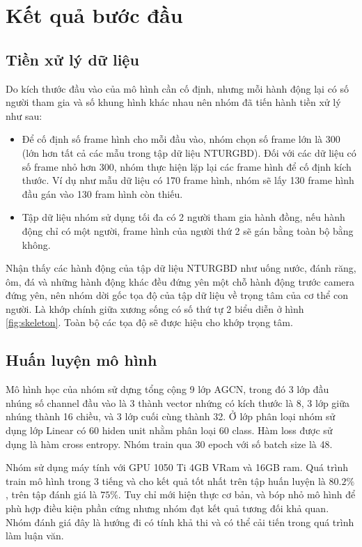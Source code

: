 \section{Kết quả bước đầu}
\label{section:result}

\subsection{Tiền xử lý dữ liệu}

Do kích thước đầu vào của mô hình cần cố định, nhưng mỗi hành động lại có số người tham gia và số khung hình khác nhau nên nhóm đã tiến hành tiền xử lý như sau:

\begin{itemize}
    \item Để cố định số frame hình cho mỗi đầu vào, nhóm chọn số frame lớn là 300 (lớn hơn tất cả các mẫu trong tập dữ liệu NTURGBD). Đối với các dữ liệu có số frame nhỏ hơn 300, nhóm thực hiện lặp lại các frame hình để  cố định kích thước. Ví dụ như mẫu dữ liệu có 170 frame hình, nhóm sẽ lấy 130 frame hình đầu gán vào 130 fram hình còn thiếu.
    \item Tập dữ liệu nhóm sử dụng tối đa có 2 người tham gia hành đồng, nếu hành động chỉ có một người, frame hình của người thứ 2 sẽ gán bằng toàn bộ bằng không.
\end{itemize}

Nhận thấy các hành động của tập dữ liệu NTURGBD như uống nước, đánh răng, ôm, đá và những hành động khác đều đứng yên một chỗ hành động trước camera đứng yên, nên nhóm dời gốc tọa độ của tập dữ liệu về trọng tâm của cơ thể con người. Là khớp chính giữa xương sống có số thứ tự 2 biểu diễn ở hình \ref{fig:skeleton}. Toàn bộ các tọa độ sẽ được hiệu cho khớp trọng tâm.

\subsection{Huấn luyện mô hình}

Mô hình học của nhóm sử dựng tổng cộng 9 lớp AGCN, trong đó 3 lớp đầu nhúng số channel đầu vào là 3 thành vector nhứng có kích thước là 8, 3 lớp giữa nhúng thành 16 chiều, và 3 lớp cuối cùng thành 32. Ở lớp phân loại nhóm sử dụng lớp Linear có 60 hiden unit nhằm phân loại 60 class. Hàm loss được sử dụng là hàm cross entropy. Nhóm train qua 30 epoch với số batch size là 48.

Nhóm sử dụng máy tính với GPU 1050 Ti 4GB VRam và 16GB ram. Quá trình train mô hình trong 3 tiếng và cho kết quả tốt nhất trên tập huấn luyện là $80.2\%$, trên tập đánh giá là $75\%$. Tuy chỉ mới hiện thực cơ bản, và bóp nhỏ mô hình để phù hợp điều kiện phần cứng nhưng nhóm đạt kết quả tương đối khả quan. Nhóm đánh giá đây là hướng đi có tính khả thi và có thể cải tiến trong quá trình làm luận văn.

